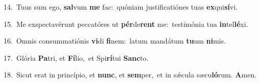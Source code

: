 {\numbfont\textcolor{\numbcolor}{14.}}~Tuus sum ego, \textbf{sal}\-vum \textbf{me} fac:~\star quóniam justificatiónes tuas \textbf{ex}\-qui\-\textbf{sí}\-vi.\par
{\numbfont\textcolor{\numbcolor}{15.}}~Me exspectavérunt peccatóres ut \textbf{pér}\-de\textbf{rent} me:~\star testimónia tua \textbf{in}\-tel\-\textbf{lé}\-xi.\par
{\numbfont\textcolor{\numbcolor}{16.}}~Omnis consummatiónis \textbf{vi}\-di \textbf{fi}\-nem:~\star latum mandátum \textbf{tu}\-um \textbf{ni}\-mis.\par
{\numbfont\textcolor{\numbcolor}{17.}}~Glória \textbf{Pa}\-tri, et \textbf{Fí}\-lio,~\star et Spi\-\textbf{rí}\-tui \textbf{Sanc}\-to.\par
{\numbfont\textcolor{\numbcolor}{18.}}~Sicut erat in princípio, et \textbf{nunc}\-, et \textbf{sem}\-per,~\star et in sǽcula sæcu\-\textbf{ló}\-rum. \textbf{A}\-men.\par

